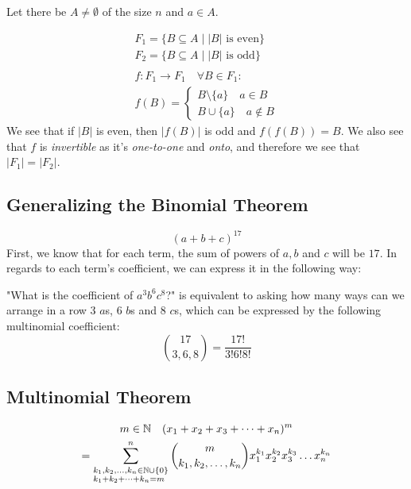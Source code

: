 \documentclass[00_complete]{subfiles}
\begin{document}
Let there be $A\neq \emptyset$ of the size $n$ and $a \in A$.

$$
\begin{gathered}
    F_1=\{ B \subseteq A \mid |B| \text{ is even}\} \\
    F_2=\{ B \subseteq A \mid |B| \text{ is odd}\} \\
    \\
    f: F_1 \to F_1 \quad \forall B \in F_1: \\
    f(B)=\begin{cases}
        B \setminus \{a\} \quad a \in B \\
        B \cup \{a\} \quad a \notin B
    \end{cases}
\end{gathered}
$$
We see that if $|B|$ is even, then $|f(B)|$ is odd and $f(f(B))=B$. We also see
that $f$ is \emph{invertible} as it's \emph{one-to-one} and \emph{onto}, and therefore we see
that $|F_1|=|F_2|$.

\subsection{Generalizing the Binomial Theorem}

\begin{example}
$$
    (a+b+c)^{17}
$$
First, we know that for each term, the sum of powers of $a,b$ and $c$ will be
$17$. In regards to each term's coefficient, we can express it in the following
way:

"What is the coefficient of $a^3b^6c^8$?" is equivalent to asking how many ways
can we arrange in a row  3 $a$s, 6 $b$s and 8 $c$s, which can be expressed by
the following multinomial coefficient:
$$\binom{17}{3,6,8} = \frac{17!}{3!6!8!}$$
\end{example}


\subsection{Multinomial Theorem}

$$
\begin{gathered}
    m \in \mathbb{N} \quad (x_1+x_2+x_3+ \dots + x_n)^m \\
    = \sum_{\begin{subarray}{l}
        k_1,k_2,\dots,k_n \in \mathbb{N} \cup \{0\} \\
        k_1+k_2+\dots+k_n = m
    \end{subarray}}^n
    \binom{m}{k_1,k_2,\dots,k_n}
    x_1^{k_1}x_2^{k_2}x_3^{k_3}\dots x_n^{k_n}
\end{gathered}
$$
\end{document}
